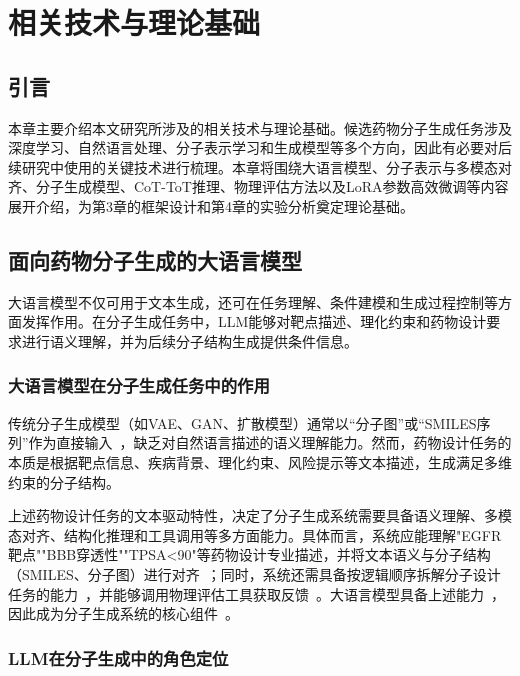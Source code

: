 \chapter{相关技术与理论基础}\label{chap:theory}

\section{引言}\label{sec:ch2-intro}

本章主要介绍本文研究所涉及的相关技术与理论基础。候选药物分子生成任务涉及深度学习、自然语言处理、分子表示学习和生成模型等多个方向，因此有必要对后续研究中使用的关键技术进行梳理。本章将围绕大语言模型、分子表示与多模态对齐、分子生成模型、CoT-ToT推理、物理评估方法以及LoRA参数高效微调等内容展开介绍，为第3章的框架设计和第4章的实验分析奠定理论基础。

\section{面向药物分子生成的大语言模型}\label{sec:llm-for-molecular-design}

大语言模型不仅可用于文本生成，还可在任务理解、条件建模和生成过程控制等方面发挥作用。在分子生成任务中，LLM能够对靶点描述、理化约束和药物设计要求进行语义理解，并为后续分子结构生成提供条件信息。

\subsection{大语言模型在分子生成任务中的作用}

传统分子生成模型（如VAE、GAN、扩散模型）通常以“分子图”或“SMILES序列”作为直接输入~\cite{GomezBombarelli2018,Bagal2021}，缺乏对自然语言描述的语义理解能力。然而，药物设计任务的本质是根据靶点信息、疾病背景、理化约束、风险提示等文本描述，生成满足多维约束的分子结构。

上述药物设计任务的文本驱动特性，决定了分子生成系统需要具备语义理解、多模态对齐、结构化推理和工具调用等多方面能力。具体而言，系统应能理解"EGFR靶点""BBB穿透性""TPSA<90"等药物设计专业描述，并将文本语义与分子结构（SMILES、分子图）进行对齐~\cite{Wei2022}；同时，系统还需具备按逻辑顺序拆解分子设计任务的能力~\cite{Wei2022}，并能够调用物理评估工具获取反馈~\cite{Li2025DrugPilot}。大语言模型具备上述能力~\cite{Qwen2Team2024,jin2025effective}，因此成为分子生成系统的核心组件~\cite{jin2025effective,Li2025DrugPilot}。

\subsection{LLM在分子生成中的角色定位}

